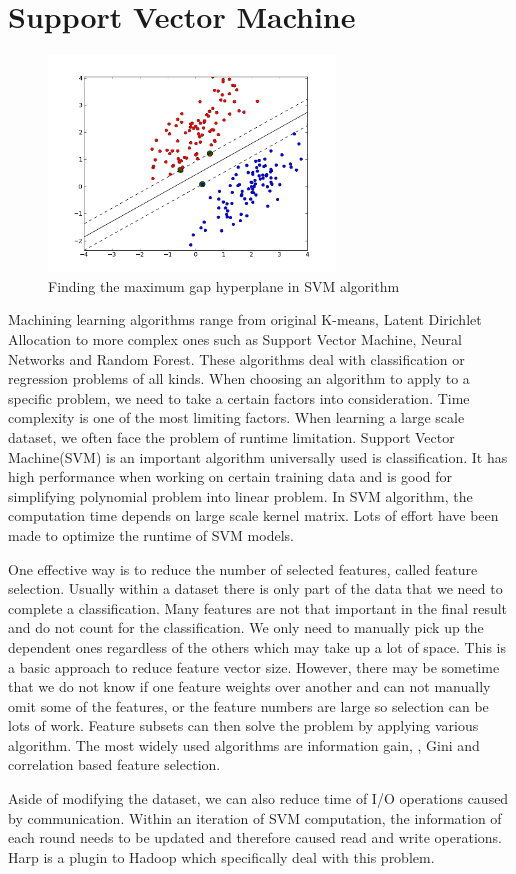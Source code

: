 \section{Support Vector Machine}
\begin{figure}[htbp]
\centering
\includegraphics[width=3.0in]{image/SVM.png}
\caption{Finding the maximum gap hyperplane in SVM algorithm}
\label{SVM}
\end{figure}

Machining learning algorithms range from original K-means, Latent Dirichlet Allocation\cite{blei2003latent} to more complex ones such as Support Vector Machine, Neural Networks and Random Forest\cite{liaw2002classification}. These algorithms deal with classification or regression problems of all kinds. When choosing an algorithm to apply to a specific problem, we need to take a certain factors into consideration. Time complexity is one of the most limiting factors. When learning a large scale dataset, we often face the problem of runtime limitation. Support Vector Machine(SVM) is an important algorithm universally used is classification. It has high performance when working on certain training data and is good for simplifying polynomial problem into linear problem. In SVM algorithm, the computation time depends on large scale kernel matrix. Lots of effort have been made to optimize the runtime of SVM models.

One effective way is to reduce the number of selected features, called feature selection. Usually within a dataset there is only part of the data that we need to complete a classification. Many features are not that important in the final result and do not count for the classification. We only need to manually pick up the dependent ones regardless of the others which may take up a lot of space. This is a basic approach to reduce feature vector size\cite{weston2000feature}.
However, there may be sometime that we do not know if one feature weights over another and can not manually omit some of the features, or the feature numbers are large so selection can be lots of work. Feature subsets can then solve the problem by applying various algorithm. The most widely used algorithms are information gain\cite{kullback1951information}, 
, Gini\cite{yitzhaki1979relative}
 and correlation based feature selection\cite{hall1999correlation}.

Aside of modifying the dataset, we can also reduce time of I/O operations caused by communication. Within an iteration of SVM computation, the information of each round needs to be updated and therefore caused read and write operations. Harp is a plugin to Hadoop which specifically deal with this problem.

